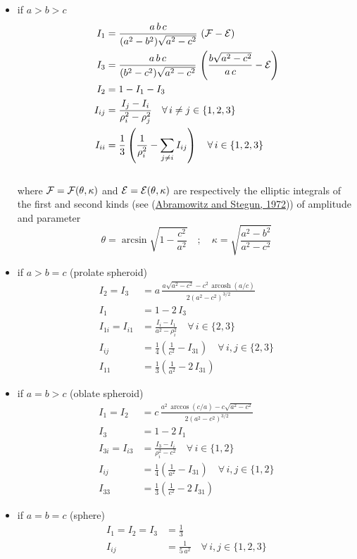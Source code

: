 \documentclass[
  letterpaper,
  DIV=11,
  numbers=noendperiod]{scrreprt}
\providecommand{\tightlist}{%
  \setlength{\itemsep}{0pt}\setlength{\parskip}{0pt}}\usepackage{longtable,booktabs,array}
\begin{document}
\begin{itemize}
\tightlist
\item
  if \(a > b > c\) \[\begin{aligned}
    I_1&=\frac{a\,b\,c}{(a^2-b^2)\sqrt{a^2-c^2}}\,
    \left({\cal F}-{\cal E}\right)\\
    I_3&=\frac{a\,b\,c}{(b^2-c^2)\sqrt{a^2-c^2}}\,
    \left(\frac{b\sqrt{a^2-c^2}}{a\,c}-
    {\cal E}\right)\\
    I_2&=1-I_1-I_3\\
    I_{ij}&=\frac{I_j-I_i}{\rho_i^2-\rho_j^2}\quad\forall\, i\neq j\in\{1,2,3\}\\
    I_{ii}&=\frac{1}{3}\left(
    \frac{1}{\rho_i^2}-
    \sum_{j\neq i}I_{ij} \right) 
    \quad\forall\, i\in\{1,2,3\}
    \end{aligned}\]\\
  where \({\cal F}={\cal F}(\theta,\kappa)\) and
  \({\cal E}={\cal E}(\theta,\kappa)\) are respectively the elliptic
  integrals of the first and second kinds (see
  (\protect\hyperlink{ref-abramowitz1972}{Abramowitz and Stegun, 1972}))
  of amplitude and parameter \[
    \theta=\arcsin{\sqrt{1-\frac{c^2}{a^2}}}
    \quad;\quad
    \kappa=\sqrt{\frac{a^2-b^2}{a^2-c^2}}
    \]
\item
  if \(a > b = c\) (prolate spheroid) \[\begin{aligned}
    I_2=I_3&=a\,
    \frac{a\sqrt{a^2-c^2}-c^2\,\mathop{\mathrm{arcosh}}{(a/c)}}
    {2\left(a^2-c^2\right)^{3/2}}\\
    I_1&=1-2\,I_3\\
    I_{1i}=I_{i1}&=\frac{I_i-I_1}{a^2-\rho_i^2}\quad
    \forall\, i\in\{2,3\}\\
    I_{ij}&=\frac{1}{4}
    \left(\frac{1}{c^2}-I_{31} \right) 
    \quad\forall\, i,j\in\{2,3\}\\
    I_{11}&=\frac{1}{3}
    \left(\frac{1}{a^2}-2\,I_{31} \right)
    \end{aligned}\]
\item
  if \(a = b > c\) (oblate spheroid) \[\begin{aligned}
    I_1=I_2&=c\,
    \frac{a^2\,\arccos{(c/a)}-c\sqrt{a^2-c^2}}
    {2\left(a^2-c^2\right)^{3/2}}\\
    I_3&=1-2\,I_1\\
    I_{3i}=I_{i3}&=\frac{I_3-I_i}{\rho_i^2-c^2}\quad
    \forall\, i\in\{1,2\}\\
    I_{ij}&=\frac{1}{4}
    \left(\frac{1}{a^2}-I_{31} \right) 
    \quad\forall\, i,j\in\{1,2\}\\
    I_{33}&=\frac{1}{3}
    \left(\frac{1}{c^2}-2\,I_{31} \right)
    \end{aligned}\]
\item
  if \(a = b = c\) (sphere) \[\begin{aligned}
    I_1=I_2=I_3&=\frac{1}{3}\\
    I_{ij}&=\frac{1}{5\,a^2}\quad\forall\, i,j\in\{1,2,3\}
    \end{aligned}\]
\end{itemize}
\end{document}
